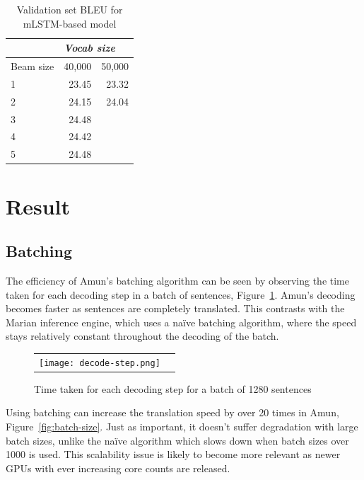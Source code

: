 \documentclass[11pt,a4paper]{article}
\begin{document}
\begin{table}
\begin{center}
\begin{tabular}{|l|r|r|} \hline
		& \multicolumn{2}{|l|}{\emph{Vocab size}}	\\ \hline	
Beam size	& 40,000	& 50,000 \\ \hline
1 		& 23.45		& 23.32	\\ 
2		& 24.15		& 24.04	\\
3		& 24.48		&  	\\
4		& 24.42		& 	\\
5		& 24.48		& 	\\ \hline
\end{tabular}
\end{center}
\caption{Validation set BLEU for mLSTM-based model}
\label{tab:mLSTM BLEU - vocab sizes}
\end{table}

\section{Result}
\label{sec:Result}

\subsection{Batching}

The efficiency of Amun's batching algorithm can be seen by observing the time taken for each decoding step in a batch of sentences, Figure~\ref{fig:decode-step}. Amun's decoding becomes faster as sentences are completely translated. This contrasts with the Marian inference engine, which uses a na\"ive batching algorithm, where the speed stays relatively constant throughout the decoding of the batch.

\begin{figure}
\centering
\begin{tabular}{cc}
{\texttt{[image: decode-step.png]}} 
\end{tabular}
\caption{Time taken for each decoding step for a batch of 1280 sentences}
\label{fig:decode-step}
\end{figure} 

Using batching can increase the translation speed by over 20 times in Amun, Figure~\ref{fig:batch-size}. Just as important, it doesn't suffer degradation with large batch sizes, unlike the na\"ive algorithm which slows down when batch sizes over 1000 is used. This scalability issue is likely to become more relevant as newer GPUs with ever increasing core counts are released.
\end{document}
